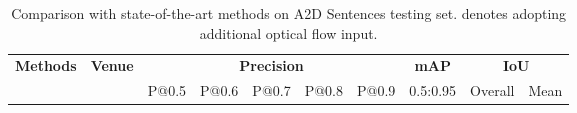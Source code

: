 \documentclass[10pt,twocolumn,letterpaper]{article}
\begin{document}
\begin{table*}[t!]
	\centering
	\scriptsize
	\renewcommand{\arraystretch}{1.0}
	\renewcommand{\tabcolsep}{4.3mm}
	\caption{Comparison with state-of-the-art methods on A2D Sentences testing set.  denotes adopting additional optical flow input.}
	\vspace{-3mm}
	\begin{tabular}{cccc|cc|ccccc|c|cc|} 
	   \hline
        \multicolumn{4}{|c|}{\multirow{2}{*}{\textbf{Methods}}}  & \multicolumn{2}{|c|}{\multirow{2}{*}{\textbf{Venue}}} & \multicolumn{5}{c|}{\textbf{Precision}}  & \multicolumn{1}{c|}{\textbf{mAP}}  & \multicolumn{2}{c|}{\textbf{IoU}} \\ \cline{7-14}
        \multicolumn{4}{|c|}{}                                   &  \multicolumn{2}{|c|}{}                                 &\multicolumn{1}{c|}{P@0.5}               &\multicolumn{1}{c|}{P@0.6} &\multicolumn{1}{c|}{P@0.7}      &\multicolumn{1}{c|}{P@0.8}  &\multicolumn{1}{|c|}{P@0.9}  &\multicolumn{1}{c|}{0.5:0.95}      &\multicolumn{1}{c|}{Overall}  &\multicolumn{1}{c|}{Mean}   \\  \hline
        

\end{tabular}
\end{table*}
\end{document}
